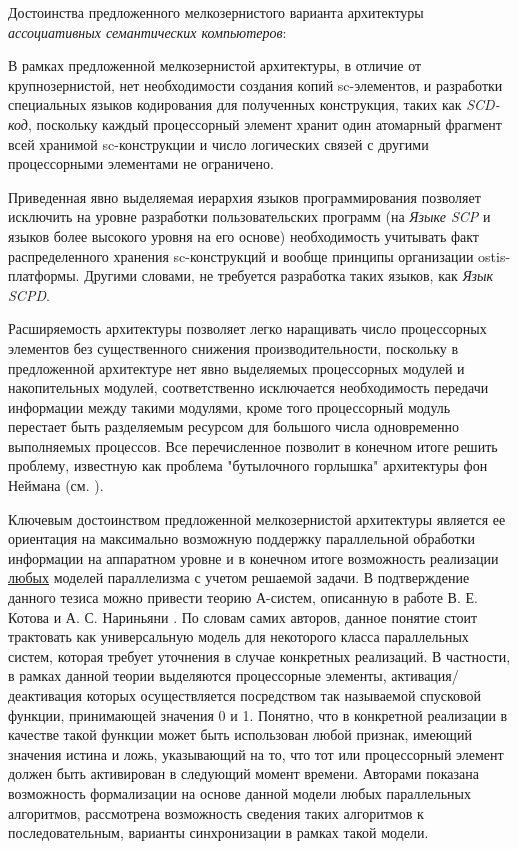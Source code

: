 Достоинства предложенного мелкозернистого варианта архитектуры \textit{ассоциативных семантических компьютеров}:
\begin{textitemize}
	\item В рамках предложенной мелкозернистой архитектуры, в отличие от крупнозернистой, нет необходимости создания копий sc-элементов, и разработки специальных языков кодирования для полученных конструкция, таких как \textit{SCD-код}, поскольку каждый процессорный элемент хранит один атомарный фрагмент всей хранимой sc-конструкции и число логических связей с другими процессорными элементами не ограничено.
	\item Приведенная явно выделяемая иерархия языков программирования позволяет исключить на уровне разработки пользовательских программ (на \textit{Языке SCP} и языков более высокого уровня на его основе) необходимость учитывать факт распределенного хранения sc-конструкций и вообще принципы организации ostis-платформы. Другими словами, не требуется разработка таких языков, как \textit{Язык SCPD}.
	\item Расширяемость архитектуры позволяет легко наращивать число процессорных элементов без существенного снижения производительности, поскольку в предложенной архитектуре нет явно выделяемых процессорных модулей и накопительных модулей, соответственно исключается необходимость передачи информации между такими модулями, кроме того процессорный модуль перестает быть разделяемым ресурсом для большого числа одновременно выполняемых процессов. Все перечисленное позволит в конечном итоге решить проблему, известную как проблема "бутылочного горлышка"{} архитектуры фон Неймана (см. ).
	\item Ключевым достоинством предложенной мелкозернистой архитектуры является ее ориентация на максимально возможную поддержку параллельной обработки информации на аппаратном уровне и в конечном итоге возможность реализации \underline{любых} моделей параллелизма с учетом решаемой задачи. В подтверждение данного тезиса можно привести теорию А-систем, описанную в работе В. Е. Котова и А. С. Нариньяни . По словам самих авторов, данное понятие стоит трактовать как универсальную модель для некоторого класса параллельных систем, которая требует уточнения в случае конкретных реализаций. В частности, в рамках данной теории выделяются процессорные элементы, активация/деактивация которых осуществляется посредством так называемой спусковой функции, принимающей значения 0 и 1. Понятно, что в конкретной реализации в качестве такой функции может быть использован любой признак, имеющий значения истина и ложь, указывающий на то, что тот или процессорный элемент должен быть активирован в следующий момент времени. Авторами показана возможность формализации на основе данной модели любых параллельных алгоритмов, рассмотрена возможность сведения таких алгоритмов к последовательным, варианты синхронизации в рамках такой модели. 
	

\end{textitemize}
